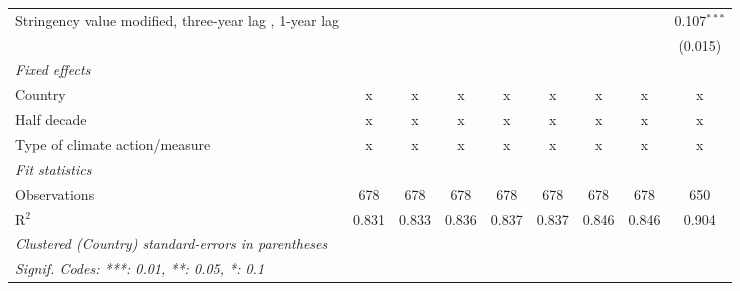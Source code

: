 \begin{table}[htbp]
\begin{tabular}{lcccccccc}
      Stringency value modified, three-year lag , 1-year lag                      &                &               &                &                &                &                &                & 0.107$^{***}$\\   
                                                                                  &                &               &                &                &                &                &                & (0.015)\\   
      \emph{Fixed effects}\\
      Country                                                                     & x              & x             & x              & x              & x              & x              & x              & x\\  
      Half decade                                                                 & x              & x             & x              & x              & x              & x              & x              & x\\  
      Type of climate action/measure                                              & x              & x             & x              & x              & x              & x              & x              & x\\  
      \midrule \emph{Fit statistics}\\
      Observations                                                                & 678            & 678           & 678            & 678            & 678            & 678            & 678            & 650\\  
      R$^2$                                                                       & 0.831          & 0.833         & 0.836          & 0.837          & 0.837          & 0.846          & 0.846          & 0.904\\  
      \midrule
      \multicolumn{9}{l}{\emph{Clustered (Country) standard-errors in parentheses}}\\
      \multicolumn{9}{l}{\emph{Signif. Codes: ***: 0.01, **: 0.05, *: 0.1}}\\
   \end{tabular}
\end{table}


